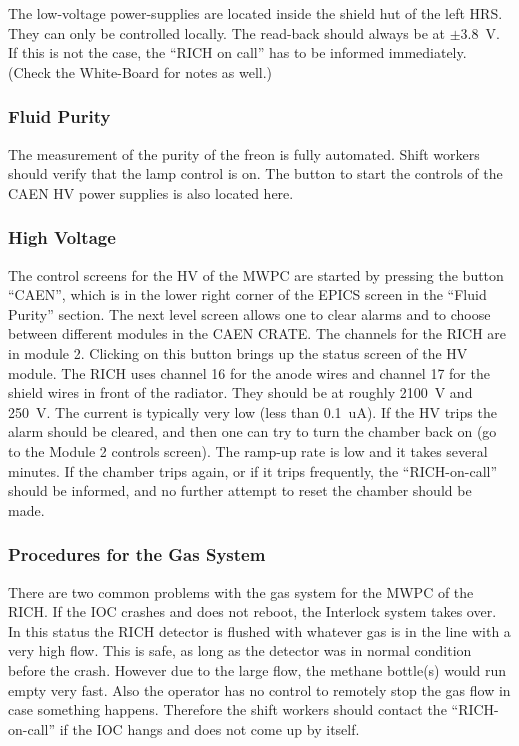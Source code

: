 {The low-voltage power-supplies are located inside the shield hut of the 
left HRS. They can only be controlled locally. 
The read-back should always
be at $\pm$3.8~V. If this is not the case, the 
``RICH on call'' has to be informed immediately.
(Check the White-Board for notes as well.)

\subsubsection{Fluid Purity}

The measurement of the purity of the freon is fully automated.
Shift workers should verify that the lamp control is on.
The button to start the controls of the CAEN HV power supplies 
is also located here.

\subsubsection{High Voltage}

The control screens for the HV of the MWPC
are started by pressing the button ``CAEN'', which is 
in the lower right corner of the EPICS screen
in the ``Fluid Purity'' section. 
The next level screen allows one to clear alarms and to choose between
different modules in the CAEN CRATE. The channels for the RICH are in
module 2. Clicking on this button brings up the status screen of the 
HV module. The RICH uses channel 16 for the anode wires and channel
17 for the shield wires in front of the radiator. They should be at
roughly 2100~V and 250~V. The current is typically very low (less
than 0.1~uA). If the HV trips the alarm should be cleared,
and then one can try to turn the chamber back on (go to the 
Module 2 controls screen). The ramp-up rate is low and it takes
several minutes. If the chamber trips again, or if it trips frequently, 
the ``RICH-on-call''
should be informed, and no further attempt to reset the chamber should
be made.

\subsubsection{Procedures for the Gas System}
\label{sec:rich_measures}

There are two common problems with the gas system for the 
MWPC of the RICH. If the IOC crashes and does not reboot,
the Interlock system takes over. In this status the 
RICH detector is flushed with whatever gas is in the line
with a very high flow. This is safe, as long as the detector
was in normal condition before the crash. However due to the 
large flow, the methane bottle(s) would run empty very fast.
Also the operator has no control to remotely stop the gas flow
in case something happens. Therefore the shift workers should 
contact the ``RICH-on-call'' if the IOC hangs and does not come 
up by itself.

}
